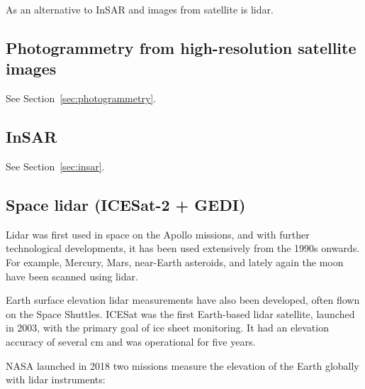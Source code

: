 As an alternative to InSAR and images from satellite is lidar.



\subsection{Photogrammetry from high-resolution satellite images}

See Section~\ref{sec:photogrammetry}.


\subsection{InSAR}

See Section~\ref{sec:insar}.


\subsection{Space lidar (ICESat-2 + GEDI)}

Lidar was first used in space on the Apollo missions, and with further technological developments, it has been used extensively from the 1990s onwards.
For example, Mercury, Mars, near-Earth asteroids, and lately again the moon have been scanned using lidar.

%

Earth surface elevation lidar measurements have also been developed, often flown on the Space Shuttles.
ICESat was the first Earth-based lidar satellite, launched in 2003, with the primary goal of ice sheet monitoring.
It had an elevation accuracy of several cm and was operational for five years.

%

NASA launched in 2018 two missions measure the elevation of the Earth globally with lidar instruments: 

